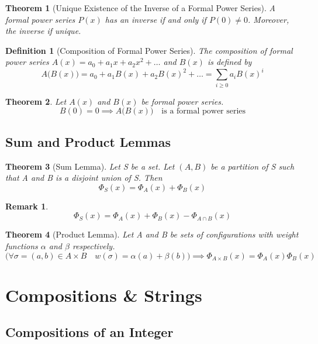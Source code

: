 \documentclass[11pt, oneside]{book}
\theoremstyle{break}
\newtheorem{thm}{Theorem}[section]
\newtheorem{defn}{Definition}[section]
\newtheorem*{remark}{Remark}
\begin{document}
\begin{thm}[Unique Existence of the Inverse of a Formal Power Series]
	A formal power series $P(x)$ has an inverse if and only if $P(0) \neq 0$. Moreover, the inverse if unique.
\end{thm}

\begin{defn}[Composition of Formal Power Series]
	The composition of formal power series $A(x) = a_0 + a_1x + a_2x^2 + \hdots$ and $B(x)$ is defined by
	\[
		A\Big(B(x)\Big) = a_0 + a_1B(x) + a_2B(x)^2 + \hdots = \sum_{i \geq 0} a_iB(x)^i
	\]
\end{defn}

\begin{thm}
	Let $A(x)$ and $B(x)$ be formal power series.
	\[
		B(0) = 0 \implies A\Big(B(x)\Big) \quad \text{is a formal power series}
	\]
\end{thm}


\section{Sum and Product Lemmas}

\begin{thm}[Sum Lemma]
	Let S be a set. Let $(A, B)$ be a partition of S such that A and B is a disjoint union of S. Then
	\[
		\Phi_S(x) = \Phi_A(x) + \Phi_B(x)
	\]
\end{thm}

\begin{remark}
	\[
		\Phi_S(x) = \Phi_A(x) + \Phi_B(x) - \Phi_{A \cap B}(x)
	\]
\end{remark}

\begin{thm}[Product Lemma]
	Let A and B be sets of configurations with weight functions $\alpha$ and $\beta$ respectively.
	\[
		\Big(\forall \sigma = (a, b) \in A \times B \quad w(\sigma) = \alpha(a) + \beta(b) \Big) \implies \Phi_{A \times B}(x) = \Phi_A(x) \Phi_B(x)
	\]
\end{thm}



\chapter{Compositions \& Strings}


\section{Compositions of an Integer}
\end{document}
